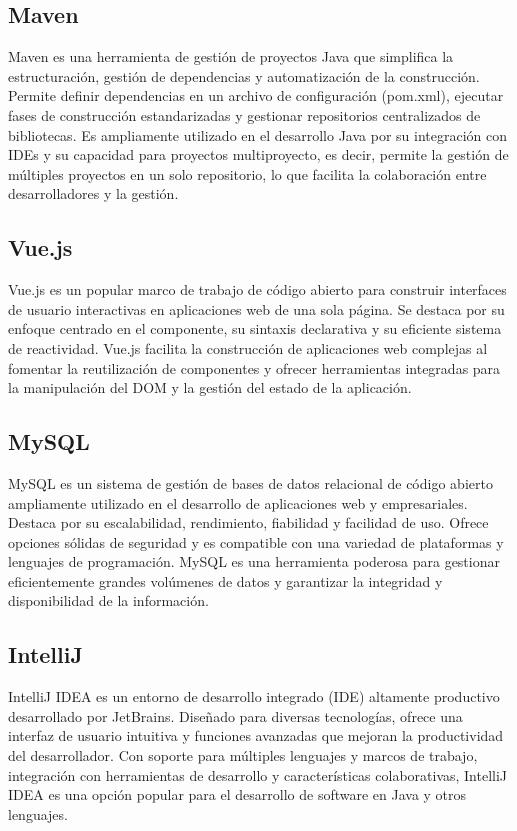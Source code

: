 \subsection{Maven}
Maven es una herramienta de gestión de proyectos Java que simplifica la estructuración, gestión de dependencias y automatización de la construcción. 
Permite definir dependencias en un archivo de configuración (pom.xml), ejecutar fases de construcción estandarizadas y gestionar repositorios 
centralizados de bibliotecas. Es ampliamente utilizado en el desarrollo Java por su integración con IDEs y su capacidad para proyectos multiproyecto, es decir,
permite la gestión de múltiples proyectos en un solo repositorio, lo que facilita la colaboración entre desarrolladores y la gestión.
\subsection{Vue.js}
Vue.js\cite{vue} es un popular marco de trabajo de código abierto para construir interfaces de usuario interactivas en aplicaciones web de una sola página. 
Se destaca por su enfoque centrado en el componente, su sintaxis declarativa y su eficiente sistema de reactividad. Vue.js facilita la construcción 
de aplicaciones web complejas al fomentar la reutilización de componentes y ofrecer herramientas integradas para la manipulación del DOM y la gestión 
del estado de la aplicación.

\subsection{MySQL}
MySQL es un sistema de gestión de bases de datos relacional de código abierto ampliamente utilizado en el desarrollo de 
aplicaciones web y empresariales. Destaca por su escalabilidad, rendimiento, fiabilidad y facilidad de uso. Ofrece opciones 
sólidas de seguridad y es compatible con una variedad de plataformas y lenguajes de programación. MySQL es una herramienta poderosa 
para gestionar eficientemente grandes volúmenes de datos y garantizar la integridad y disponibilidad de la información.

\subsection{IntelliJ}
IntelliJ IDEA es un entorno de desarrollo integrado (IDE) altamente productivo desarrollado por JetBrains. 
Diseñado para diversas tecnologías, ofrece una interfaz de usuario intuitiva y funciones avanzadas que mejoran la 
productividad del desarrollador. Con soporte para múltiples lenguajes y marcos de trabajo, integración con herramientas de desarrollo y 
características colaborativas, IntelliJ IDEA es una opción popular para el desarrollo de software en Java y otros lenguajes.

